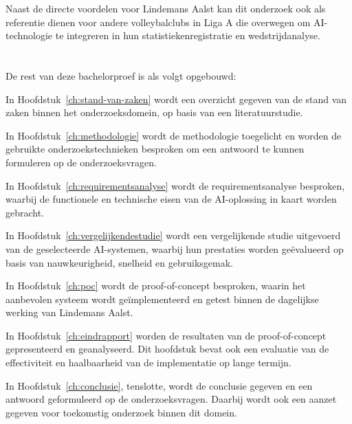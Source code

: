 Naast de directe voordelen voor Lindemans Aalst kan dit onderzoek ook als referentie dienen voor andere volleybalclubs in Liga A die overwegen om AI-technologie te integreren in hun statistiekenregistratie en wedstrijdanalyse.

\section{}%
\label{sec:opzet-bachelorproef}


De rest van deze bachelorproef is als volgt opgebouwd:

In Hoofdstuk~\ref{ch:stand-van-zaken} wordt een overzicht gegeven van de stand van zaken binnen het onderzoeksdomein, op basis van een literatuurstudie.

In Hoofdstuk~\ref{ch:methodologie} wordt de methodologie toegelicht en worden de gebruikte onderzoekstechnieken besproken om een antwoord te kunnen formuleren op de onderzoeksvragen.

In Hoofdstuk~\ref{ch:requirementsanalyse} wordt de requirementsanalyse besproken, waarbij de functionele en technische eisen van de AI-oplossing in kaart worden gebracht.

In Hoofdstuk~\ref{ch:vergelijkendestudie} wordt een vergelijkende studie uitgevoerd van de geselecteerde AI-systemen, waarbij hun prestaties worden geëvalueerd op basis van nauwkeurigheid, snelheid en gebruiksgemak.	

In Hoofdstuk~\ref{ch:poc} wordt de proof-of-concept besproken, waarin het aanbevolen systeem wordt geïmplementeerd en getest binnen de dagelijkse werking van Lindemans Aalst.

In Hoofdstuk~\ref{ch:eindrapport} worden de resultaten van de proof-of-concept gepresenteerd en geanalyseerd. Dit hoofdstuk bevat ook een evaluatie van de effectiviteit en haalbaarheid van de implementatie op lange termijn.

In Hoofdstuk~\ref{ch:conclusie}, tenslotte, wordt de conclusie gegeven en een antwoord geformuleerd op de onderzoeksvragen. Daarbij wordt ook een aanzet gegeven voor toekomstig onderzoek binnen dit domein.